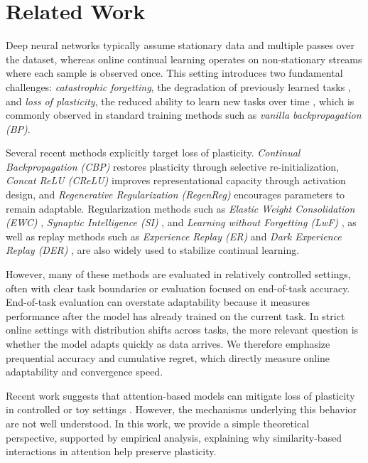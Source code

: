 \documentclass{article}
\begin{document}
\section{Related Work}

Deep neural networks typically assume stationary data and multiple passes over the dataset, whereas online continual learning operates on non-stationary streams where each sample is observed once. This setting introduces two fundamental challenges: \emph{catastrophic forgetting}, the degradation of previously learned tasks \citep{mccloskey1989catastrophic, kemker2018measuring, ramasesh2021anatomy}, and \emph{loss of plasticity}, the reduced ability to learn new tasks over time \citep{dohare2024loss, abbas2023plasticity, chen2023stability}, which is commonly observed in standard training methods such as \emph{vanilla backpropagation (BP)}.

Several recent methods explicitly target loss of plasticity. \emph{Continual Backpropagation (CBP)} \citep{dohare2024loss} restores plasticity through selective re-initialization, \emph{Concat ReLU (CReLU)} \citep{abbas2023plasticity} improves representational capacity through activation design, and \emph{Regenerative Regularization (RegenReg)} \citep{abati2020regenerative} encourages parameters to remain adaptable. Regularization methods such as  \emph{Elastic Weight Consolidation (EWC)} \citep{kirkpatrick2017overcoming}, \emph{Synaptic Intelligence (SI)} \citep{zenke2017si}, and \emph{Learning without Forgetting (LwF)} \citep{li2016lwf}, as well as replay methods such as \emph{Experience Replay (ER)} \citep{rolnick2019experience} and \emph{Dark Experience Replay (DER)} \citep{buzzega2020dark}, are also widely used to stabilize continual learning.

However, many of these methods are evaluated in relatively controlled settings, often with clear task boundaries or evaluation focused on end-of-task accuracy. End-of-task evaluation can overstate adaptability because it measures performance after the model has already trained on the current task. In strict online settings with distribution shifts across tasks, the more relevant question is whether the model adapts quickly as data arrives. We therefore emphasize prequential accuracy and cumulative regret, which directly measure online adaptability and convergence speed.

Recent work suggests that attention-based models can mitigate loss of plasticity in controlled or toy settings \citep{wang2025replay}. However, the mechanisms underlying this behavior are not well understood. In this work, we provide a simple theoretical perspective, supported by empirical analysis, explaining why similarity-based interactions in attention help preserve plasticity.
\end{document}
